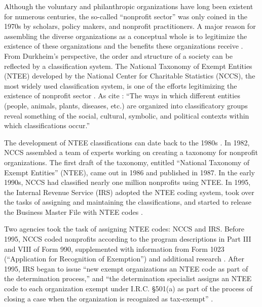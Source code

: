 \documentclass[11pt]{article}
\begin{document}
Although the voluntary and philanthropic organizations have long been existent for numerous centuries, the so-called ``nonprofit sector'' was only coined in the 1970s by scholars, policy makers, and nonprofit practitioners. A major reason for assembling the diverse organizations as a conceptual whole is to legitimize the existence of these organizations and the benefits these organizations receive \parencites[54-55]{HallHistoricalOverviewPhilanthropy2006}{BarmanClassificatoryStrugglesNonprofit2013}. From Durkheim's \citeyear{DurkheimElementaryFormsReligious2012} perspective, the order and structure of a society can be reflected by a classification system. The National Taxonomy of Exempt Entities (NTEE) developed by the National Center for Charitable Statistics (NCCS), the most widely used classification system, is one of the efforts legitimizing the existence of nonprofit sector \parencite{Hodgkinsonnewresearchplanning1991,HodgkinsonMappingnonprofitsector1990}. As \textcite[105]{BarmanClassificatoryStrugglesNonprofit2013} cite \textcite[601]{ClarkeSimpleTechnologyComplex1996}: ``The ways in which different entities (people, animals, plants, diseases, etc.) are organized into classificatory groups reveal something of the social, cultural, symbolic, and political contexts within which classifications occur.''

The development of NTEE classifications can date back to the 1980s \parencite[8-9, 11]{HodgkinsonMappingnonprofitsector1990}. In 1982, NCCS assembled a team of experts working on creating a taxonomy for nonprofit organizations. The first draft of the taxonomy, entitled ``National Taxonomy of Exempt Entities'' (NTEE), came out in 1986 and published in 1987. In the early 1990s, NCCS had classified nearly one million nonprofits using NTEE. In 1995, the Internal Revenue Service (IRS) adopted the NTEE coding system, took over the tasks of assigning and maintaining the classifications, and started to release the Business Master File with NTEE codes \parencite{USInternalRevenueServiceExemptOrganizationsBusiness2014,USInternalRevenueServiceIRSStaticFiles2013}.

Two agencies took the task of assigning NTEE codes: NCCS and IRS. Before 1995, NCCS coded nonprofits according to the program descriptions in Part III and VIII of Form 990, supplemented with information from Form 1023 (``Application for Recognition of Exemption'') and additional research \parencite[16]{NationalCenterforCharitableStatisticsGuideUsingNCCS2006}. After 1995, IRS began to issue ``new exempt organizations an NTEE code as part of the determination process,'' and ``the determination specialist assigns an NTEE code to each organization exempt under I.R.C. \S 501(a) as part of the process of closing a case when the organization is recognized as tax-exempt'' \parencite[1]{USInternalRevenueServiceIRSStaticFiles2013}.
\end{document}
